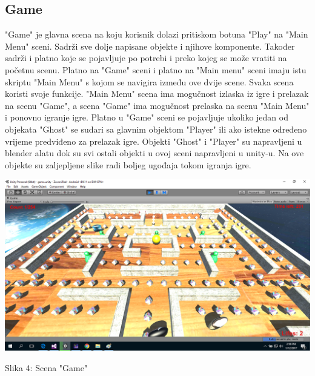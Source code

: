 \subsection{Game}
"Game" je glavna scena na koju korisnik dolazi pritiskom botuna "Play" na "Main Menu" sceni. Sadrži sve dolje napisane objekte i njihove komponente. Također sadrži i platno koje se pojavljuje po potrebi i preko kojeg se može vratiti na početnu scenu. Platno na "Game" sceni i platno na "Main menu" sceni imaju istu skriptu "Main Menu" s kojom se navigira između ove dvije scene. Svaka scena koristi svoje funkcije. "Main Menu" scena ima mogučnost izlaska iz igre i prelazak na scenu "Game", a scena "Game" ima  mogučnost prelaska na scenu "Main Menu" i ponovno igranje igre. Platno u "Game" sceni se pojavljuje ukoliko jedan od objekata "Ghost" se sudari sa glavnim objektom "Player" ili ako istekne određeno vrijeme predviđeno za prelazak igre. Objekti "Ghost" i "Player" su napravljeni u blender alatu dok su svi ostali objekti u ovoj sceni napravljeni u unity-u. Na ove objekte su zaljepljene slike radi boljeg ugođaja tokom igranja igre.


\begin{center}
\includegraphics[scale=0.35]{scena2.png}

Slika 4: Scena "Game"
\end{center}
